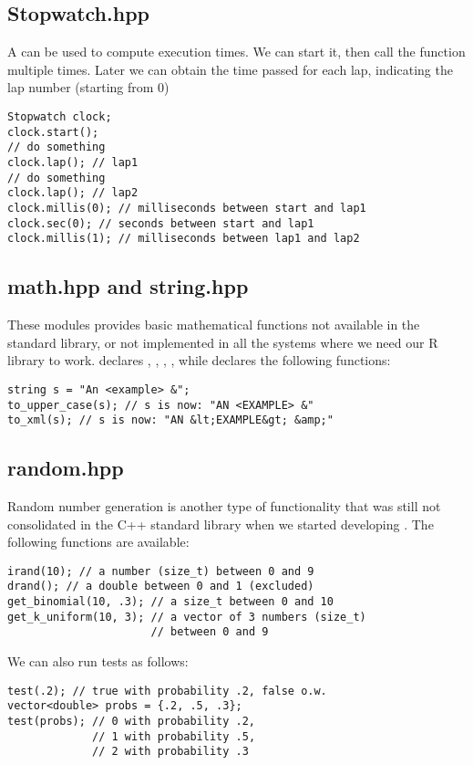 \subsection{Stopwatch.hpp}

A  can be used to compute execution times. We can start it, then call the  function multiple times.
Later we can obtain the time passed for each lap, indicating the lap number (starting from $0$)
\begin{lstlisting}[style=c++]
Stopwatch clock;
clock.start();
// do something
clock.lap(); // lap1
// do something
clock.lap(); // lap2
clock.millis(0); // milliseconds between start and lap1
clock.sec(0); // seconds between start and lap1
clock.millis(1); // milliseconds between lap1 and lap2
\end{lstlisting}

\subsection{math.hpp and string.hpp}

These modules provides basic mathematical functions not available in the standard library, or not implemented in all the systems where we need our R library to work.  declares , , , , while  declares the following functions:

\begin{lstlisting}[style=c++]
string s = "An <example> &";
to_upper_case(s); // s is now: "AN <EXAMPLE> &"
to_xml(s); // s is now: "AN &lt;EXAMPLE&gt; &amp;"
\end{lstlisting}

\subsection{random.hpp}

Random number generation is another type of functionality that was still not consolidated in the C++ standard library when we started developing . The following functions are available:
\begin{lstlisting}[style=c++]
irand(10); // a number (size_t) between 0 and 9 
drand(); // a double between 0 and 1 (excluded)
get_binomial(10, .3); // a size_t between 0 and 10
get_k_uniform(10, 3); // a vector of 3 numbers (size_t) 
                      // between 0 and 9 
\end{lstlisting}
We can also run tests as follows:
\begin{lstlisting}[style=c++]
test(.2); // true with probability .2, false o.w.
vector<double> probs = {.2, .5, .3};
test(probs); // 0 with probability .2, 
             // 1 with probability .5, 
             // 2 with probability .3
\end{lstlisting}

